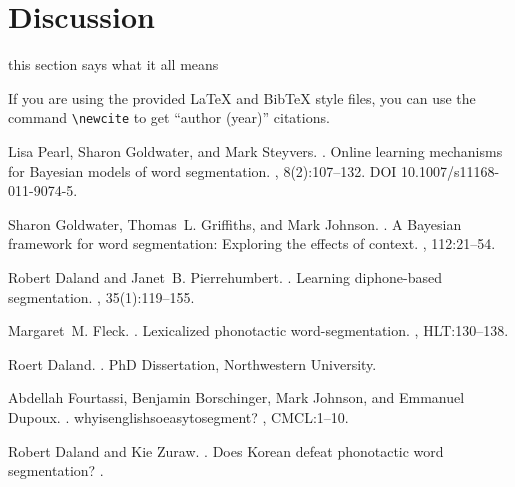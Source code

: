 \documentclass[11pt]{article}
\begin{document}
\section{Discussion}

this section says what it all means

If you are using the provided \LaTeX{} and Bib\TeX{} style files, you
can use the command \verb|\newcite| to get ``author (year)'' citations.


%
%

\begin{thebibliography}{}

Lisa Pearl, Sharon Goldwater, and Mark Steyvers.
.
\newblock Online learning mechanisms for Bayesian models of word segmentation.
, 8(2):107--132.
\newblock DOI 10.1007/s11168-011-9074-5.

Sharon Goldwater, Thomas~L. Griffiths, and Mark Johnson.
.
\newblock A Bayesian framework for word segmentation:
    Exploring the effects of context.
, 112:21--54.

Robert Daland and Janet~B. Pierrehumbert.
.
\newblock Learning diphone-based segmentation.
, 35(1):119--155.

Margaret~M. Fleck.
.
\newblock Lexicalized phonotactic word-segmentation.
, HLT:130--138.

Roert Daland.
.
\newblock PhD Dissertation, Northwestern University.

Abdellah Fourtassi, Benjamin Borschinger, Mark Johnson, and Emmanuel Dupoux.
.
\newblock whyisenglishsoeasytosegment?
, CMCL:1--10.

Robert Daland and Kie Zuraw.
.
\newblock Does Korean defeat phonotactic word segmentation?
.



\end{thebibliography}
\end{document}
